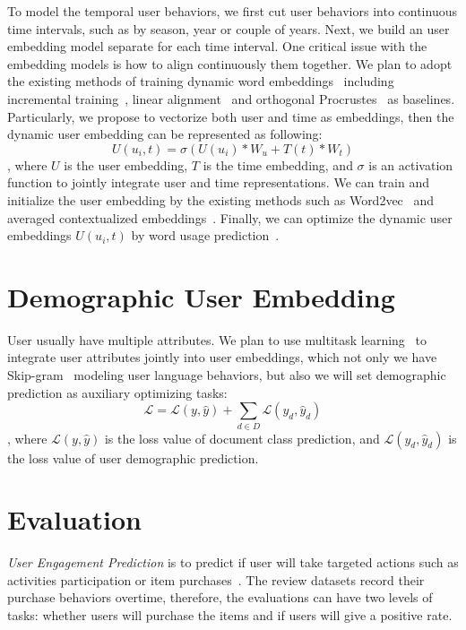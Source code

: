 To model the temporal user behaviors, we first cut user behaviors into continuous time intervals, such as by season, year or couple of years.
Next, we build an user embedding model separate for each time interval.
One critical issue with the embedding models is how to align continuously them together.
We plan to adopt the existing methods of training dynamic word embeddings~\cite{kutuzov2018diachronic} including incremental training~\cite{kim2014temporal}, linear alignment~\cite{kulkarni2015statistically} and orthogonal Procrustes~\cite{hamilton2016diachronic} as baselines.
Particularly, we propose to vectorize both user and time as embeddings, then the dynamic user embedding can be represented as following:
$$U(u_i, t) = \sigma(U(u_i)*W_u + T(t)*W_t)$$
, where $U$ is the user embedding, $T$ is the time embedding, and $\sigma$ is an activation function to jointly integrate user and time representations.
We can train and initialize the user embedding by the existing methods such as Word2vec~\cite{amir2016modelling} and averaged contextualized embeddings~\cite{devlin2019bert}.
Finally, we can optimize the dynamic user embeddings $U(u_i, t)$ by word usage prediction~\cite{amir2016modelling}.


\section{Demographic User Embedding}
User usually have multiple attributes.
We plan to use multitask learning~\cite{huang2019neuraluser} to integrate user attributes jointly into user embeddings, which not only we have Skip-gram~\cite{mikolov2013distributed} modeling user language behaviors, but also we will set demographic prediction as auxiliary optimizing tasks:
$$ \mathcal{L} = \mathcal{L}(y, \hat{y}) + \sum_{d \in D}\mathcal{L}(y_d, \hat{y}_d)$$
, where $\mathcal{L}(y, \hat{y})$ is the loss value of document class prediction, and $\mathcal{L}(y_d, \hat{y}_d)$ is the loss value of user demographic prediction.


\section{Evaluation}

\textit{User Engagement Prediction} is to predict if user will take targeted actions such as activities participation or item purchases~\cite{benton2016learning}.
The review datasets record their purchase behaviors overtime, therefore, the evaluations can have two levels of tasks: whether users will purchase the items and if users will give a positive rate.

